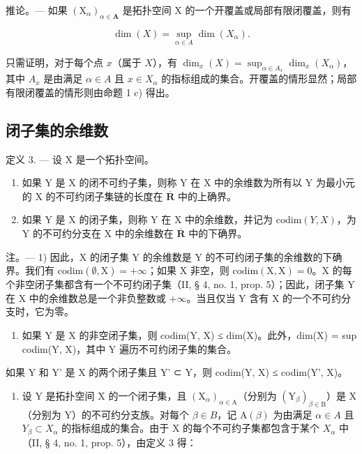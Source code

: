 推论。— 如果 \((\mathrm{X}_{\alpha})_{\alpha\in\mathbf{A}}\) 是拓扑空间 X 的一个开覆盖或局部有限闭覆盖，则有

\[
\dim (X) = \sup _ {\alpha \in A} \dim (X _ {\alpha}).
\]

只需证明，对于每个点 \(x\)（属于 \(X\)），有 \(\dim_x(X) = \sup_{\alpha \in A_x} \dim_x(X_\alpha)\)，其中 \(A_x\) 是由满足 \(\alpha \in A\) 且 \(x \in X_\alpha\) 的指标组成的集合。开覆盖的情形显然；局部有限闭覆盖的情形则由命题 1 c) 得出。

\subsection{闭子集的余维数}

定义 3. --- 设 X 是一个拓扑空间。

\begin{enumerate}
\def\labelenumi{\alph{enumi})}
\item
  如果 Y 是 X 的闭不可约子集，则称 Y 在 X 中的余维数为所有以 Y 为最小元的 X 的不可约闭子集链的长度在 \(\overline{\mathbf{R}}\) 中的上确界。
\item
  如果 Y 是 X 的闭子集，则称 Y 在 X 中的余维数，并记为 \(\text{codim}(Y, X)\)，为 Y 的不可约分支在 X 中的余维数在 \(\overline{\mathbf{R}}\) 中的下确界。
\end{enumerate}

注。--- 1) 因此，X 的闭子集 Y 的余维数是 Y 的不可约闭子集的余维数的下确界。我们有 \(\mathrm{codim}(\emptyset, \mathrm{X}) = +\infty\)；如果 X 非空，则 \(\mathrm{codim}(\mathrm{X}, \mathrm{X}) = 0\)。X 的每个非空闭子集都含有一个不可约闭子集（II, § 4, no. 1, prop. 5）；因此，闭子集 Y 在 X 中的余维数总是一个非负整数或 \(+\infty\)。当且仅当 Y 含有 X 的一个不可约分支时，它为零。

\begin{enumerate}
\def\labelenumi{\arabic{enumi})}
\setcounter{enumi}{1}
\tightlist
\item
  如果 Y 是 X 的非空闭子集，则 codim(Y, X) ≤ dim(X)。此外，dim(X) = sup codim(Y, X)，其中 Y 遍历不可约闭子集的集合。
\end{enumerate}

如果 Y 和 Y' 是 X 的两个闭子集且 Y' ⊂ Y，则 codim(Y, X) ≤ codim(Y', X)。

\begin{enumerate}
\def\labelenumi{\arabic{enumi})}
\setcounter{enumi}{2}
\tightlist
\item
  设 Y 是拓扑空间 X 的一个闭子集，且 \((\mathrm{X}_{\alpha})_{\alpha\in\mathrm{A}}\)（分别为 \((\mathrm{Y}_{\beta})_{\beta\in\mathrm{B}}\)）是 X（分别为 Y）的不可约分支族。对每个 \(\beta\in B\)，记 \(\mathrm{A}(\beta)\) 为由满足 \(\alpha\in A\) 且 \(Y_{\beta}\subset X_{\alpha}\) 的指标组成的集合。由于 X 的每个不可约子集都包含于某个 \(X_{\alpha}\) 中（II, § 4, no. 1, prop. 5），由定义 3 得：
\end{enumerate}

